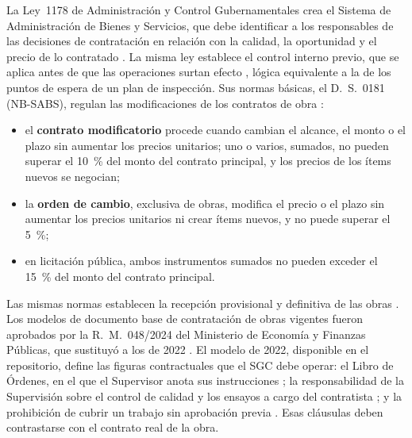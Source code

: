 La Ley~1178 de Administración y Control Gubernamentales crea el Sistema de Administración de Bienes y Servicios, que debe identificar a los responsables de las decisiones de contratación en relación con la calidad, la oportunidad y el precio de lo contratado \parencite[art.~10]{ley1178_1990}. La misma ley establece el control interno previo, que se aplica antes de que las operaciones surtan efecto \parencite[arts.~13--14]{ley1178_1990}, lógica equivalente a la de los puntos de espera de un plan de inspección. Sus normas básicas, el D.~S.~0181 (NB-SABS), regulan las modificaciones de los contratos de obra \parencite[art.~89, pp.~91--93]{ds0181_2025compilado}:
\begin{itemize}
  \item el \textbf{contrato modificatorio} procede cuando cambian el alcance, el monto o el plazo sin aumentar los precios unitarios; uno o varios, sumados, no pueden superar el 10~\% del monto del contrato principal, y los precios de los ítems nuevos se negocian;
  \item la \textbf{orden de cambio}, exclusiva de obras, modifica el precio o el plazo sin aumentar los precios unitarios ni crear ítems nuevos, y no puede superar el 5~\%;
  \item en licitación pública, ambos instrumentos sumados no pueden exceder el 15~\% del monto del contrato principal.
\end{itemize}
Las mismas normas establecen la recepción provisional y definitiva de las obras \parencite[art.~39, p.~54]{ds0181_2025compilado}. Los modelos de documento base de contratación de obras vigentes fueron aprobados por la R.~M.~048/2024 del Ministerio de Economía y Finanzas Públicas, que sustituyó a los de 2022 \parencite{rm048_2024}. El modelo de 2022, disponible en el repositorio, define las figuras contractuales que el SGC debe operar: el Libro de Órdenes, en el que el Supervisor anota sus instrucciones \parencite[cláusula~25, p.~71]{dbc2022}; la responsabilidad de la Supervisión sobre el control de calidad y los ensayos a cargo del contratista \parencite[cláusulas~26.3 y 26.6, p.~73]{dbc2022}; y la prohibición de cubrir un trabajo sin aprobación previa \parencite[cláusula~26.10, p.~74]{dbc2022}. Esas cláusulas deben contrastarse con el contrato real de la obra.

